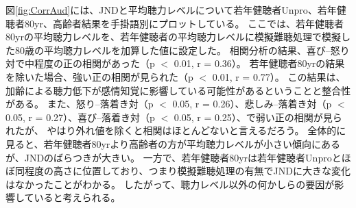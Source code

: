 図\ref{fig:CorrAud}には、JNDと平均聴力レベルについて若年健聴者Unpro、若年健聴者80yr、高齢者結果を手掛語別にプロットしている。
ここでは、若年健聴者80yrの平均聴力レベルを、若年健聴者の平均聴力レベルに模擬難聴処理で模擬した80歳の平均聴力レベル\cite{tsuiki2002nihon}を加算した値に設定した。
相関分析の結果、喜び--怒り対で中程度の正の相関があった（p $<$ 0.01, r = 0.36）。
若年健聴者80yrの結果を除いた場合、強い正の相関が見られた（p $<$ 0.01, r = 0.77）。
この結果は、加齢による聴力低下が感情知覚に影響している可能性があるということと整合性がある。
また、怒り--落着き対（p $<$ 0.05, r = 0.26）、悲しみ--落着き対（p $<$ 0.05, r = 0.27）、喜び--落着き対（p $<$ 0.05, r = 0.25）、で弱い正の相関が見られたが、
やはり外れ値を除くと相関はほとんどないと言えるだろう。
全体的に見ると、若年健聴者80yrより高齢者の方が平均聴力レベルが小さい傾向にあるが、JNDのばらつきが大きい。
一方で、若年健聴者80yrは若年健聴者Unproとほぼ同程度の高さに位置しており、つまり模擬難聴処理の有無でJNDに大きな変化はなかったことがわかる。
したがって、聴力レベル以外の何かしらの要因が影響していると考えられる。




